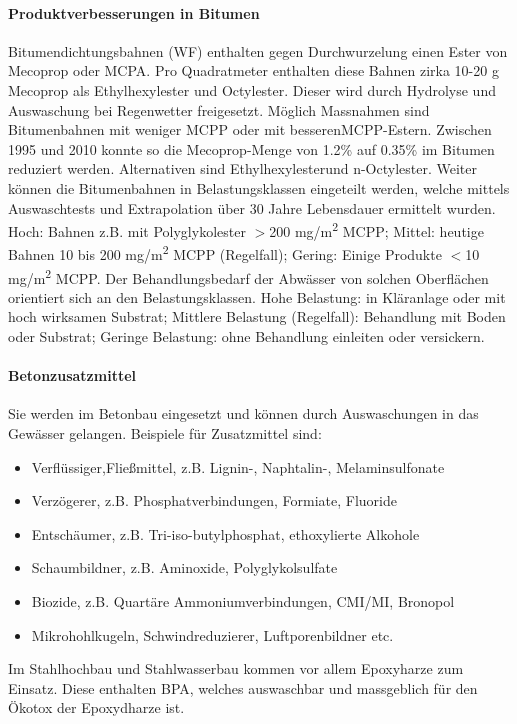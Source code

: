 \documentclass[9pt, openright=false]{scrartcl}
\begin{document}
\paragraph{Produktverbesserungen in Bitumen} Bitumendichtungsbahnen (WF) enthalten gegen Durchwurzelung einen Ester von Mecoprop oder MCPA. Pro Quadratmeter enthalten diese Bahnen zirka 10-20 g Mecoprop als Ethylhexylester und Octylester. Dieser wird durch Hydrolyse und Auswaschung bei Regenwetter freigesetzt. Möglich Massnahmen sind Bitumenbahnen mit weniger MCPP oder mit \glqq besseren\grqq {}MCPP-Estern. Zwischen 1995 und 2010 konnte so die Mecoprop-Menge von 1.2\% auf 0.35\% im Bitumen reduziert werden. Alternativen sind Ethylhexylesterund n-Octylester. Weiter können die Bitumenbahnen in Belastungsklassen eingeteilt werden, welche mittels Auswaschtests und Extrapolation über 30 Jahre Lebensdauer ermittelt wurden. Hoch: Bahnen z.B. mit Polyglykolester $>$200 mg/m\textsuperscript{2} MCPP; Mittel: heutige Bahnen 10 bis 200 mg/m\textsuperscript{2} MCPP (Regelfall); Gering: Einige Produkte $<$10 mg/m\textsuperscript{2} MCPP. Der Behandlungsbedarf der Abwässer von solchen Oberflächen orientiert sich an den Belastungsklassen. Hohe Belastung: in Kläranlage oder mit hoch wirksamen Substrat; Mittlere Belastung (Regelfall): Behandlung mit Boden oder Substrat; Geringe Belastung: ohne Behandlung einleiten oder versickern. 
\paragraph{Betonzusatzmittel} Sie werden im Betonbau eingesetzt und können durch Auswaschungen in das Gewässer gelangen. Beispiele für Zusatzmittel sind: \begin{itemize}
\item Verflüssiger,Fließmittel, z.B. Lignin-, Naphtalin-, Melaminsulfonate
\item Verzögerer, z.B. Phosphatverbindungen, Formiate, Fluoride
\item Entschäumer, z.B. Tri-iso-butylphosphat, ethoxylierte Alkohole
\item Schaumbildner, z.B. Aminoxide, Polyglykolsulfate
\item Biozide, z.B. Quartäre Ammoniumverbindungen, CMI/MI, Bronopol
\item Mikrohohlkugeln, Schwindreduzierer, Luftporenbildner etc.
\end{itemize}
Im Stahlhochbau und Stahlwasserbau kommen vor allem Epoxyharze zum Einsatz. Diese enthalten BPA, welches auswaschbar und massgeblich für den Ökotox der Epoxydharze ist.
\end{document}
